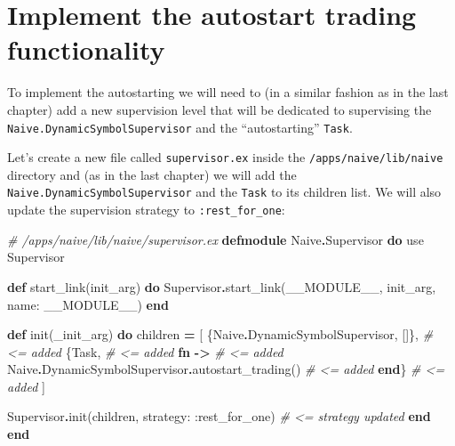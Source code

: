 \documentclass[
]{book}
\newenvironment{Shaded}{\begin{snugshade}}{\end{snugshade}}
\newcommand{\CommentTok}[1]{\textcolor[rgb]{0.56,0.35,0.01}{\textit{#1}}}
\newcommand{\ConstantTok}[1]{\textcolor[rgb]{0.00,0.00,0.00}{#1}}
\newcommand{\ImportTok}[1]{#1}
\newcommand{\KeywordTok}[1]{\textcolor[rgb]{0.13,0.29,0.53}{\textbf{#1}}}
\newcommand{\NormalTok}[1]{#1}
\newcommand{\OperatorTok}[1]{\textcolor[rgb]{0.81,0.36,0.00}{\textbf{#1}}}
\newcommand{\VariableTok}[1]{\textcolor[rgb]{0.00,0.00,0.00}{#1}}
\begin{document}
\hypertarget{implement-the-autostart-trading-functionality}{%
\section{Implement the autostart trading functionality}\label{implement-the-autostart-trading-functionality}}

To implement the autostarting we will need to (in a similar fashion as in the last chapter) add a new supervision level that will be dedicated to supervising the \texttt{Naive.DynamicSymbolSupervisor} and the ``autostarting'' \texttt{Task}.

Let's create a new file called \texttt{supervisor.ex} inside the \texttt{/apps/naive/lib/naive} directory and (as in the last chapter) we will add the \texttt{Naive.DynamicSymbolSupervisor} and the \texttt{Task} to its children list. We will also update the supervision strategy to \texttt{:rest\_for\_one}:

\begin{Shaded}
\begin{Highlighting}[]
\CommentTok{\# /apps/naive/lib/naive/supervisor.ex}
\KeywordTok{defmodule} \ConstantTok{Naive}\OperatorTok{.}\ConstantTok{Supervisor} \KeywordTok{do}
  \ImportTok{use} \ConstantTok{Supervisor}

  \KeywordTok{def}\NormalTok{ start\_link(init\_arg) }\KeywordTok{do}
    \ConstantTok{Supervisor}\OperatorTok{.}\NormalTok{start\_link(}\ConstantTok{\_\_MODULE\_\_}\NormalTok{, init\_arg, }\VariableTok{name:} \ConstantTok{\_\_MODULE\_\_}\NormalTok{)}
  \KeywordTok{end}

  \KeywordTok{def}\NormalTok{ init(\_init\_arg) }\KeywordTok{do}
\NormalTok{    children }\OperatorTok{=}\NormalTok{ [}
\NormalTok{      \{}\ConstantTok{Naive}\OperatorTok{.}\ConstantTok{DynamicSymbolSupervisor}\NormalTok{, []\},                 }\CommentTok{\# \textless{}= added}
\NormalTok{      \{}\ConstantTok{Task}\NormalTok{,                                               }\CommentTok{\# \textless{}= added}
       \KeywordTok{fn} \OperatorTok{{-}\textgreater{}}                                               \CommentTok{\# \textless{}= added}
         \ConstantTok{Naive}\OperatorTok{.}\ConstantTok{DynamicSymbolSupervisor}\OperatorTok{.}\NormalTok{autostart\_trading() }\CommentTok{\# \textless{}= added}
       \KeywordTok{end}\NormalTok{\}                                                }\CommentTok{\# \textless{}= added}
\NormalTok{    ]}

    \ConstantTok{Supervisor}\OperatorTok{.}\NormalTok{init(children, }\VariableTok{strategy:} \VariableTok{:rest\_for\_one}\NormalTok{) }\CommentTok{\# \textless{}= strategy updated}
  \KeywordTok{end}
\KeywordTok{end}
\end{Highlighting}
\end{Shaded}
\end{document}
